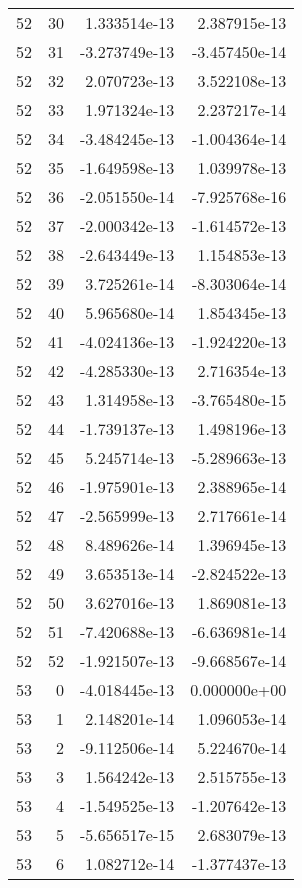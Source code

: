 \begin{tabular}{rrrr}
  52 &   30 &  1.333514e-13 &  2.387915e-13 \\
  52 &   31 & -3.273749e-13 & -3.457450e-14 \\
  52 &   32 &  2.070723e-13 &  3.522108e-13 \\
  52 &   33 &  1.971324e-13 &  2.237217e-14 \\
  52 &   34 & -3.484245e-13 & -1.004364e-14 \\
  52 &   35 & -1.649598e-13 &  1.039978e-13 \\
  52 &   36 & -2.051550e-14 & -7.925768e-16 \\
  52 &   37 & -2.000342e-13 & -1.614572e-13 \\
  52 &   38 & -2.643449e-13 &  1.154853e-13 \\
  52 &   39 &  3.725261e-14 & -8.303064e-14 \\
  52 &   40 &  5.965680e-14 &  1.854345e-13 \\
  52 &   41 & -4.024136e-13 & -1.924220e-13 \\
  52 &   42 & -4.285330e-13 &  2.716354e-13 \\
  52 &   43 &  1.314958e-13 & -3.765480e-15 \\
  52 &   44 & -1.739137e-13 &  1.498196e-13 \\
  52 &   45 &  5.245714e-13 & -5.289663e-13 \\
  52 &   46 & -1.975901e-13 &  2.388965e-14 \\
  52 &   47 & -2.565999e-13 &  2.717661e-14 \\
  52 &   48 &  8.489626e-14 &  1.396945e-13 \\
  52 &   49 &  3.653513e-14 & -2.824522e-13 \\
  52 &   50 &  3.627016e-13 &  1.869081e-13 \\
  52 &   51 & -7.420688e-13 & -6.636981e-14 \\
  52 &   52 & -1.921507e-13 & -9.668567e-14 \\
  53 &    0 & -4.018445e-13 &  0.000000e+00 \\
  53 &    1 &  2.148201e-14 &  1.096053e-14 \\
  53 &    2 & -9.112506e-14 &  5.224670e-14 \\
  53 &    3 &  1.564242e-13 &  2.515755e-13 \\
  53 &    4 & -1.549525e-13 & -1.207642e-13 \\
  53 &    5 & -5.656517e-15 &  2.683079e-13 \\
  53 &    6 &  1.082712e-14 & -1.377437e-13 \\

\end{tabular}
